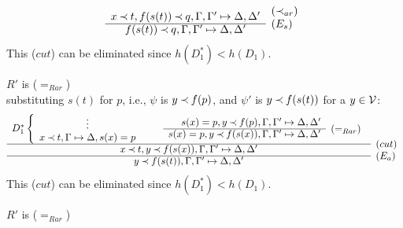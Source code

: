 \begin{PROOF}
\begin{LS}
\begin{LSA}
\begin{LSB}
\begin{LSC}
\begin{LSD}
\[\begin{array}{cl}
x\Incl t, f(s(t))\Incl q, \Gamma, \Gamma' \Seq \Delta, \Delta' 
 &   \raisebox{1.2ex}[1.5ex][0ex]{($\Incl_{ar}$)} \\ \cline{1-1}
f(s(t))\Incl q, \Gamma, \Gamma' \Seq \Delta, \Delta' 
 &   \raisebox{1.2ex}[1.5ex][0ex]{($E_s$)}
\end{array} \]
This ($cut$) can be eliminated since $h(D_1^*)<h(D_1)$.
%
\item $R'$ is ($=_{Rar}$)\\
substituting $s(t)$ for $p$, i.e., $\psi$ is $y\mathbin{\prec} f(p)$, and $\psi'$ is
$y\mathbin{\prec} f(s(t))$ for a $y\in{\cal V}$:
\[ \begin{array}{cl}
D_1^* \left \{ \begin{array}{c} \vdots \\ 
 x\Incl t, \GSD, s(x)=p \end{array} \right . \ \ \ \ \ \ 
\begin{array}{rl}
 s(x)=p, y\Incl f(p), \Gamma, \Gamma' \Seq \Delta, \Delta' \\
 \cline{1-1}
 s(x)=p, y\Incl f(s(x)), \Gamma, \Gamma' \Seq \Delta, \Delta' 
 &   \raisebox{1.2ex}[1.5ex][0ex]{($=_{Rar}$)} 
 \end{array} \\ \cline{1-1}
x\Incl t, y\Incl f(s(x)), \Gamma, \Gamma' \Seq \Delta, \Delta' 
 &   \raisebox{1.2ex}[1.5ex][0ex]{($cut$)} \\ \cline{1-1}
y\Incl f(s(t)), \Gamma, \Gamma' \Seq \Delta, \Delta' 
 &   \raisebox{1.2ex}[1.5ex][0ex]{($E_a$)}
\end{array} \]
This ($cut$) can be eliminated since $h(D_1^*)<h(D_1)$.
%
\item $R'$ is ($=_{Rar}$)\\

\end{LSD}
\end{LSC}
\end{LSB}
\end{LSA}
\end{LS}
\end{PROOF}
